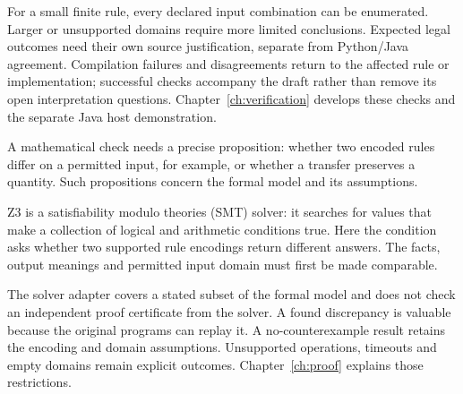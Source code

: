 \documentclass[12pt,a4paper,oneside,openany]{book}
\begin{document}
For a small finite rule, every declared input combination can be enumerated.
Larger or unsupported domains require more limited conclusions. Expected legal
outcomes need their own source justification, separate from Python/Java
agreement. Compilation failures and disagreements return to the affected rule
or implementation; successful checks accompany the draft rather than remove
its open interpretation questions. Chapter~\ref{ch:verification} develops
these checks and the separate Java host demonstration.

\clearpage
{}
A mathematical check needs a precise proposition: whether two encoded rules
differ on a permitted input, for example, or whether a transfer preserves a
quantity. Such propositions concern the formal model and its assumptions.

Z3 is a satisfiability modulo theories (SMT) solver: it searches for values that
make a collection of logical and arithmetic conditions true. Here the condition
asks whether two supported rule encodings return different answers. The facts,
output meanings and permitted input domain must first be made comparable.

\begin{MapDiagram}
\end{MapDiagram}

The solver adapter covers a stated subset of the formal model and does not
check an independent proof certificate from the solver. A found discrepancy is
valuable because the original programs can replay it. A no-counterexample
result retains the encoding and domain assumptions. Unsupported operations,
timeouts and empty domains remain explicit outcomes. Chapter~\ref{ch:proof}
explains those restrictions.
\end{document}
